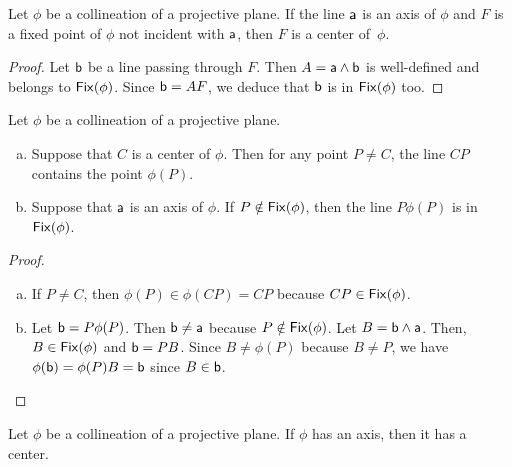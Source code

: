 \begin{lem}\label{lem:fixed-not-axis-is-center}
    Let\/ $\phi$ be a collineation of a projective plane. If the line\/ $\mathsf a$ is an axis of\/ $\phi$ and\/ $F$ is a fixed point of\/ $\phi$ not incident with\/ $\mathsf a$, then\/ $F$ is a center of\/~$\phi$.
\end{lem}

\begin{proof}
    Let $\mathsf b$ be a line passing through $F$. Then $A=\mathsf a\wedge\mathsf b$ is well-defined and belongs to $\operatorname{\mathsf{Fix}}(\phi)$. Since $\mathsf b=AF$, we deduce that $\mathsf b$ is in $\operatorname{\mathsf{Fix}}(\phi)$ too.
\end{proof}

\begin{lem}\label{lem:P-and-phi(P)}
    Let\/ $\phi$ be a collineation of a projective plane.
    \begin{enumerate}[a),font=\upshape]
        \item Suppose that\/ $C$ is a center of\/ $\phi$. Then for any point\/ $P \ne C$, the line\/ $CP$ contains the point\/ $\phi(P)$.
        \item Suppose that\/ $\mathsf a$ is an axis of\/ $\phi$. If\/ $P\notin\operatorname{\mathsf{Fix}}(\phi)$, then the line\/ $P\phi(P)$ is in\/ $\operatorname{\mathsf{Fix}}(\phi)$.
    \end{enumerate}
\end{lem}

\begin{proof}${}$
    \begin{enumerate}[a)]
        \item If $P\ne C$, then $\phi(P)\in\phi(CP)=CP$ because $CP\in\operatorname{\mathsf{Fix}}(\phi)$.

        \item Let $\mathsf b=P\phi(P)$. Then $\mathsf b\ne\mathsf a$ because $P\notin\operatorname{\mathsf{Fix}}(\phi)$. Let $B=\mathsf b\wedge\mathsf a$. Then, $B\in\operatorname{\mathsf{Fix}}(\phi)$ and $\mathsf b=PB$. Since $B\ne\phi(P)$ because $B\ne P$, we have $\phi(\mathsf b)=\phi(P)B=\mathsf b$ since $B\in\mathsf b$. \qedhere
    \end{enumerate}
\end{proof}

\begin{thm}\label{thm:axis-iff-center}
    Let\/ $\phi$ be a collineation of a projective plane. If\/ $\phi$ has an axis, then it has a center.
\end{thm}

